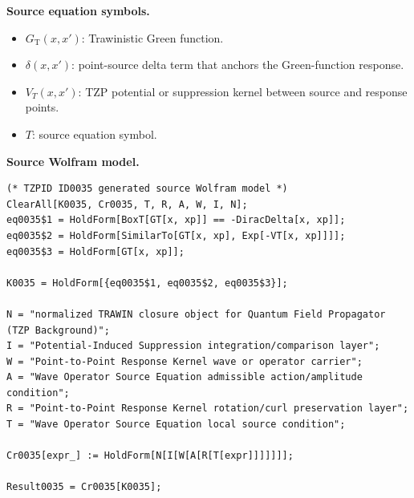 \begin{minipage}[t]{0.49\linewidth}
\begingroup
\small
\raggedright
\textbf{Source equation symbols.}\par
\begin{itemize}[leftmargin=1.35em,itemsep=1pt,topsep=1pt,parsep=0pt]
    \item $G_{\mathrm{T}}(x,x')$: Trawinistic Green function.
    \item $\delta(x,x')$: point-source delta term that anchors the Green-function response.
    \item $V_{T}(x,x')$: TZP potential or suppression kernel between source and response points.
    \item $T$: source equation symbol.
\end{itemize}
\endgroup
\end{minipage}\hfill
\begin{minipage}[t]{0.47\linewidth}
\begingroup
\scriptsize
\raggedright
\textbf{Source Wolfram model.}\par
\begin{Verbatim}[fontsize=\tiny,breaklines=true,breakanywhere=true]
(* TZPID ID0035 generated source Wolfram model *)
ClearAll[K0035, Cr0035, T, R, A, W, I, N];
eq0035$1 = HoldForm[BoxT[GT[x, xp]] == -DiracDelta[x, xp]];
eq0035$2 = HoldForm[SimilarTo[GT[x, xp], Exp[-VT[x, xp]]]];
eq0035$3 = HoldForm[GT[x, xp]];

K0035 = HoldForm[{eq0035$1, eq0035$2, eq0035$3}];

N = "normalized TRAWIN closure object for Quantum Field Propagator (TZP Background)";
I = "Potential-Induced Suppression integration/comparison layer";
W = "Point-to-Point Response Kernel wave or operator carrier";
A = "Wave Operator Source Equation admissible action/amplitude condition";
R = "Point-to-Point Response Kernel rotation/curl preservation layer";
T = "Wave Operator Source Equation local source condition";

Cr0035[expr_] := HoldForm[N[I[W[A[R[T[expr]]]]]]];

Result0035 = Cr0035[K0035];
\end{Verbatim}
\endgroup
\end{minipage}


